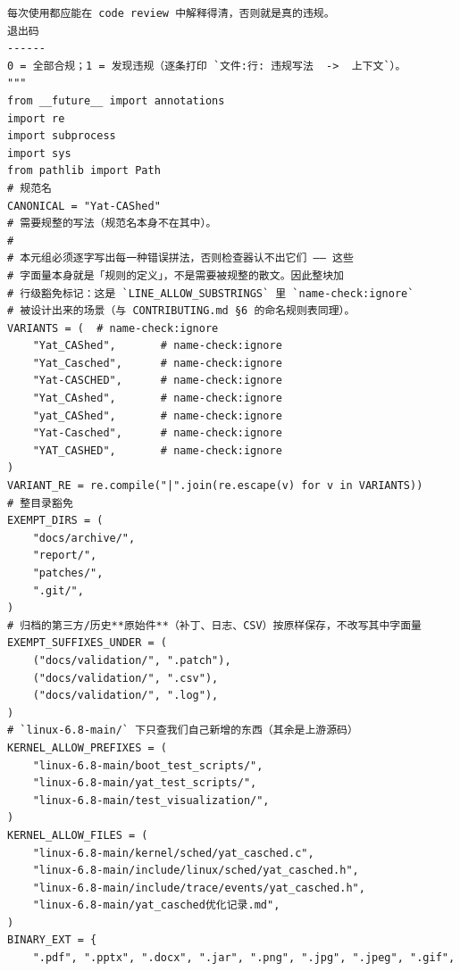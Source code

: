 \documentclass[10pt,a4paper]{article}
\newenvironment{yatpage}{\vspace*{0pt}}{\par}
\begin{document}
\newpage
\begin{yatpage}
\begin{Verbatim}[fontsize=\fontsize{8.2}{9.8}\selectfont]
    每次使用都应能在 code review 中解释得清，否则就是真的违规。
退出码
------
0 = 全部合规；1 = 发现违规（逐条打印 `文件:行: 违规写法  ->  上下文`）。
"""
from __future__ import annotations
import re
import subprocess
import sys
from pathlib import Path
# 规范名
CANONICAL = "Yat-CAShed"
# 需要规整的写法（规范名本身不在其中）。
#
# 本元组必须逐字写出每一种错误拼法，否则检查器认不出它们 —— 这些
# 字面量本身就是「规则的定义」，不是需要被规整的散文。因此整块加
# 行级豁免标记：这是 `LINE_ALLOW_SUBSTRINGS` 里 `name-check:ignore`
# 被设计出来的场景（与 CONTRIBUTING.md §6 的命名规则表同理）。
VARIANTS = (  # name-check:ignore
    "Yat_CAShed",       # name-check:ignore
    "Yat_Casched",      # name-check:ignore
    "Yat-CASCHED",      # name-check:ignore
    "Yat_CAshed",       # name-check:ignore
    "yat_CAShed",       # name-check:ignore
    "Yat-Casched",      # name-check:ignore
    "YAT_CASHED",       # name-check:ignore
)
VARIANT_RE = re.compile("|".join(re.escape(v) for v in VARIANTS))
# 整目录豁免
EXEMPT_DIRS = (
    "docs/archive/",
    "report/",
    "patches/",
    ".git/",
)
# 归档的第三方/历史**原始件**（补丁、日志、CSV）按原样保存，不改写其中字面量
EXEMPT_SUFFIXES_UNDER = (
    ("docs/validation/", ".patch"),
    ("docs/validation/", ".csv"),
    ("docs/validation/", ".log"),
)
# `linux-6.8-main/` 下只查我们自己新增的东西（其余是上游源码）
KERNEL_ALLOW_PREFIXES = (
    "linux-6.8-main/boot_test_scripts/",
    "linux-6.8-main/yat_test_scripts/",
    "linux-6.8-main/test_visualization/",
)
KERNEL_ALLOW_FILES = (
    "linux-6.8-main/kernel/sched/yat_casched.c",
    "linux-6.8-main/include/linux/sched/yat_casched.h",
    "linux-6.8-main/include/trace/events/yat_casched.h",
    "linux-6.8-main/yat_casched优化记录.md",
)
BINARY_EXT = {
    ".pdf", ".pptx", ".docx", ".jar", ".png", ".jpg", ".jpeg", ".gif",
\end{Verbatim}
\end{yatpage}
\newpage
\end{document}
